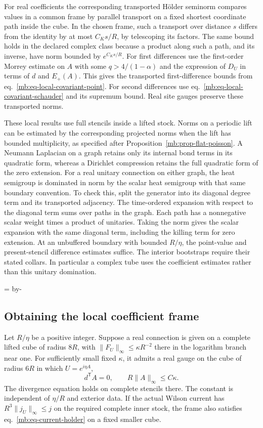 \documentclass[11pt,letterpaper,reqno]{amsart}
\makeatletter
\numberwithin{equation}{section}
\renewcommand{\eqref}[1]{\textup{eq.~\ref{#1}}}
\newcommand{\mbneedspace}[1]{\par\begingroup
  \dimen0=\pagegoal\advance\dimen0 by-\pagetotal
  \ifdim\dimen0<#1\relax\newpage\fi\endgroup}
\theoremstyle{definition}
\newcommand{\ms@minorstart}{%
  \pushQED{\qed}\renewcommand{\qedsymbol}{$\blacksquare$}}
\newenvironment{proposition}[1][]{\ms@minorstart\ms@proposition[#1]}
  {\popQED\endms@proposition}
\theoremstyle{remark}
\makeatother
\begin{document}
For real coefficients the corresponding transported Hölder
seminorm compares values in a common frame by parallel transport
on a fixed shortest coordinate path inside the cube.
In the chosen frame, such a transport over distance \(s\)
differs from the identity by at most \(C_Ks/R\), by
telescoping its factors. The same bound holds in the declared
complex class because a product along such a path, and its
inverse, have norm bounded by \(e^{C_Ks/R}\).
For first differences use the first-order Morrey estimate
on \(A\) with some \(q>4/(1-\alpha)\) and the expression
of \(D_U\) in terms of \(d\) and \(E_+(A)\).
This gives the transported first-difference bounds from
\eqref{mb:eq-local-covariant-point}. For second differences
use \eqref{mb:eq-local-covariant-schauder} and its supremum
bound. Real site gauges preserve these transported norms.

These local results use full stencils inside a lifted stock.
Norms on a periodic lift can be estimated by the corresponding
projected norms when the lift has bounded multiplicity, as
specified after Proposition~\ref{mb:prop-flat-poisson}.
A Neumann Laplacian on a graph retains only its
internal bond terms in its quadratic form, whereas a
Dirichlet compression retains the full quadratic form of
the zero extension. For a real unitary connection on either
graph, the heat semigroup is dominated in norm by the scalar
heat semigroup with that same boundary convention. To check
this, split the generator into its diagonal degree term and
its transported adjacency. The time-ordered expansion with
respect to the diagonal term sums over paths in the graph.
Each path has a nonnegative scalar weight times a product
of unitaries. Taking the norm gives the scalar expansion
with the same diagonal term, including the killing term
for zero extension. At an unbuffered boundary with bounded
\(R/\eta\), the point-value and present-stencil difference
estimates suffice. The interior bootstraps require their
stated collars. In particular a complex tube uses the
coefficient estimates rather than this unitary domination.


\mbneedspace{10\baselineskip}
\subsection{Obtaining the local coefficient frame}

\begin{proposition}[A small real Coulomb frame]\label{mb:prop-coulomb-frame}
Let \(R/\eta\) be a positive integer. Suppose a real connection
is given on a complete lifted cube of radius \(8R\), with
\(\|F_U\|_\infty\le\kappa R^{-2}\) there in the logarithm
branch near one. For sufficiently small fixed \(\kappa\),
it admits a real gauge on the cube of radius \(6R\) in
which \(U=e^{i\eta A}\),
\[
          d^{\mathsf T}A=0,\qquad R\|A\|_\infty\le C\kappa .
\]
The divergence equation holds on complete stencils there.
The constant is independent of \(\eta/R\) and exterior data.
If the actual Wilson current has \(R^3\|j_U\|_\infty\le j\)
on the required complete inner stock, the frame also
satisfies \eqref{mb:eq-current-holder} on a fixed smaller
cube.
\end{proposition}
\end{document}
